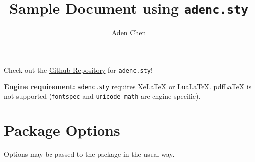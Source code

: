 \documentclass[12pt]{article}
\title{Sample Document using \texttt{adenc.sty}}
\author{Aden Chen}
\begin{document}
\maketitle
\tableofcontents

\bigskip
Check out the \href{https://github.com/AdenChen27/latex}{Github Repository} for \texttt{adenc.sty}!

\medskip\noindent
\textbf{Engine requirement:} \texttt{adenc.sty} requires XeLaTeX or LuaLaTeX. pdfLaTeX is not supported (\texttt{fontspec} and \texttt{unicode-math} are engine-specific).




\section{Package Options}
Options may be passed to the package in the usual way.
\end{document}
